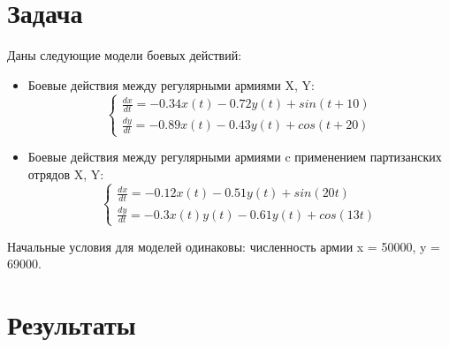 \documentclass[unicode, 12pt, a4paper,oneside]{article}
\begin{document}
    \section{Задача}
    Даны следующие модели боевых действий:
    \begin{itemize}
        \item Боевые действия между регулярными армиями X, Y:
        $$
        \begin{cases}
        \frac{dx}{dt} = -0.34x(t) - 0.72y(t) + sin(t + 10) \\
        \frac{dy}{dt} = -0.89x(t) - 0.43y(t) + cos(t + 20)
        \end{cases}
        $$
        \item Боевые действия между регулярными армиями c применением партизанских отрядов X, Y:
        $$
        \begin{cases}
        \frac{dx}{dt} = -0.12x(t) - 0.51y(t) + sin(20t) \\
        \frac{dy}{dt} = -0.3x(t)y(t) - 0.61y(t) + cos(13t)
        \end{cases}
        $$
    \end{itemize}
    Начальные условия для моделей одинаковы: численность армии x = 50000, y = 69000.
    
    \section{Результаты}
    
    
\end{document}
